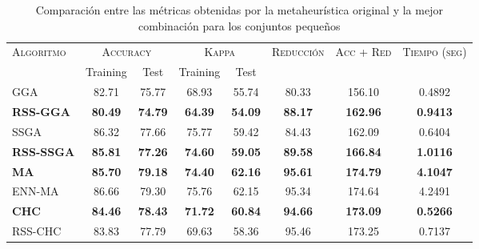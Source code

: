 \begin{table}[h!]
\centering
\begin{adjustbox}{max width =\textwidth}
\begin{tabular}{l c c c c c c c}
\hline
\multirow{2}{*}{\textsc{Algoritmo}}
	& \multicolumn{2}{c}{\textsc{Accuracy}}
	& \multicolumn{2}{c}{\textsc{Kappa}}
	& \textsc{Reducción}
	& \textsc{Acc + Red}
	& \textsc{Tiempo (seg)} \\
	& Training & Test
	& Training & Test \\ 
\hline
\hline

GGA  & 82.71 & 75.77 & 68.93 & 55.74 & 80.33 & 156.10 & 0.4892 \\
\textbf{RSS-GGA}      & \textbf{80.49} & \textbf{74.79} & \textbf{64.39} & \textbf{54.09} & \textbf{88.17} & \textbf{162.96} & \textbf{0.9413} \\

\hline

SSGA & 86.32 & 77.66 & 75.77 & 59.42 & 84.43 & 162.09 & 0.6404 \\
\textbf{RSS-SSGA} & \textbf{85.81} & \textbf{77.26} & \textbf{74.60} & \textbf{59.05} & \textbf{89.58} & \textbf{166.84} &\textbf{1.0116} \\


\hline

\textbf{MA}   & \textbf{85.70} & \textbf{79.18} & \textbf{74.40} & \textbf{62.16} & \textbf{95.61} & \textbf{174.79} & \textbf{4.1047} \\
ENN-MA & 86.66 & 79.30 & 75.76 & 62.15 & 95.34 & 174.64 & 4.2491 \\


\hline

\textbf{CHC}  & \textbf{84.46} & \textbf{78.43} & \textbf{71.72} & \textbf{60.84} & \textbf{94.66} & \textbf{173.09} & \textbf{0.5266} \\
RSS-CHC & 83.83 & 77.79 & 69.63 & 58.36 & 95.46 & 173.25 & 0.7137 \\


\hline
\end{tabular}
\end{adjustbox}
\caption{Comparación entre las métricas obtenidas por la metaheurística original y la mejor combinación para los conjuntos pequeños}
\label{peq-best-all}

\end{table}

